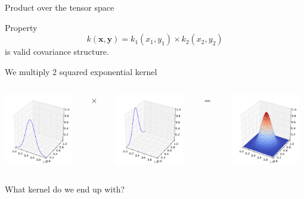 \documentclass{beamer}
\begin{document}
\begin{frame}{Product over the tensor space}
\begin{block}{Property}
\begin{equation*}
k(\textbf{x},\textbf{y}) = k_1(x_1,y_1) \times k_2(x_2,y_2)
\end{equation*}
is valid covariance structure.
\end{block}
\begin{example}
We multiply 2 squared exponential kernel
\begin{columns}[c]
\begin{column}{3cm}
\includegraphics[width=3cm]{figures/python/newfromold-sum2-k1}
\end{column}
\begin{column}{2mm}
$\times $
\end{column}
\begin{column}{3cm}
\includegraphics[width=3cm]{figures/python/newfromold-sum2-k2}
\end{column}
\begin{column}{2mm}
$=$
\end{column}
\begin{column}{3cm}
\includegraphics[width=3cm]{figures/python/newfromold-prod2-k12}
\end{column}
\end{columns}
\vspace{5mm}
 What kernel do we end up with?
\end{example}
\end{frame}
\end{document}
